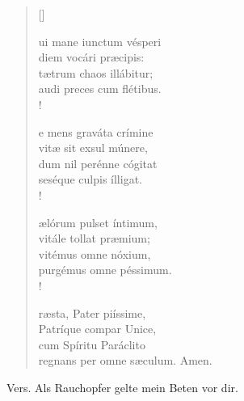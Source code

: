 \vspace{0.3cm}


\def\greinitialformat#1{{\fontsize{40}{40}\selectfont #1}}
\gresetfirstlineaboveinitial{\small \textcolor{red}{æstate}}{}
\setaboveinitialseparation{0.72mm}


\vspace{0.3cm}
\begin{verse}[\versewidth]
 

ui mane iunctum vésperi\\
diem vocári præcipis:\\
tætrum chaos illábitur;\\
audi preces cum flétibus.\\!

e mens graváta crímine\\
vitæ sit exsul múnere,\\ 
dum nil perénne cógitat\\
seséque culpis ílligat.\\!

ælórum pulset íntimum,\\
vitále tollat præmium;\\
vitémus omne nóxium,\\ 
purgémus omne péssimum.\\!

ræsta, Pater piíssime,\\ 
Patríque compar Unice,\\ 
cum Spíritu Paráclito\\
regnans per omne sæculum. Amen.


\end{verse}


\vspace{0.3cm}



Vers. Als Rauchopfer gelte mein Beten vor dir.

\vspace{0.6cm}


\def\greinitialformat#1{{\fontsize{40}{40}\selectfont #1}}
\gresetfirstlineaboveinitial{\small \textcolor{red}{Magni.}}{}
\setaboveinitialseparation{0.72mm}

